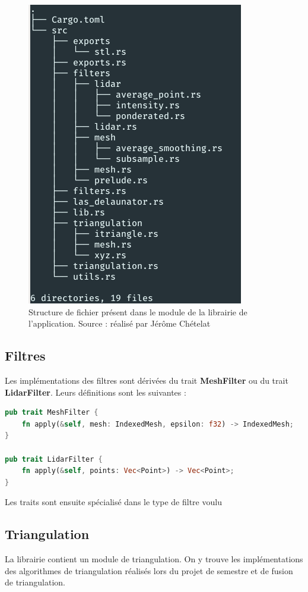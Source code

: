 \begin{figure}[htbp!]
    \centering
    \includegraphics[width=0.5\linewidth]{figures/architecture.png}
    \caption{Structure de fichier présent dans le module de la librairie de l'application. Source : réalisé par Jérôme Chételat}
    \label{fig:library_tree}
\end{figure}

\subsection{Filtres}
Les implémentations des filtres sont dérivées du trait \textbf{MeshFilter} ou du trait \textbf{LidarFilter}. Leurs définitions sont les suivantes :
\begin{lstlisting}[language=Rust, style=boxed]
pub trait MeshFilter {
    fn apply(&self, mesh: IndexedMesh, epsilon: f32) -> IndexedMesh;
}

pub trait LidarFilter {
    fn apply(&self, points: Vec<Point>) -> Vec<Point>;
}

\end{lstlisting}

Les traits sont ensuite spécialisé dans le type de filtre voulu
\subsection{Triangulation}
La librairie contient un module de triangulation.
On y trouve les implémentations des algorithmes de triangulation réalisés lors du projet de semestre et de fusion de triangulation.

